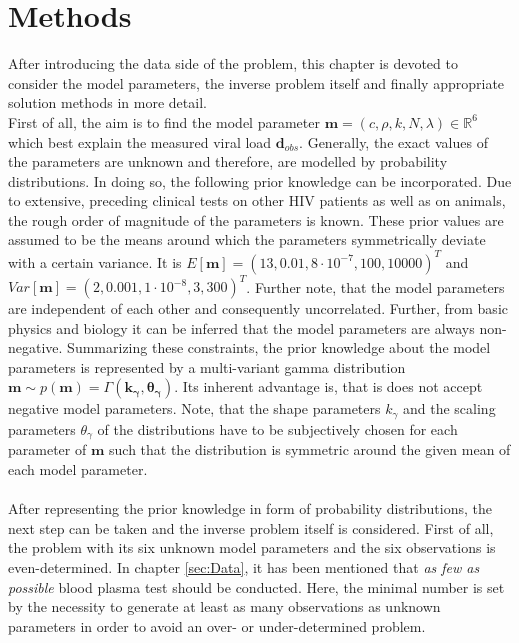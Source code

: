 \section{Methods}
\label{sec:methods}

After introducing the data side of the problem, this chapter is devoted to consider the model parameters, the inverse problem itself and finally appropriate solution methods in more detail.\\
First of all, the aim is to find the model parameter $\mathbf{m} = (c, \rho, k, N, \lambda) \in \mathbb{R}^6$ which best explain the measured viral load $\mathbf{d}_{obs}$.
Generally, the exact values of the parameters are unknown and therefore, are modelled by probability distributions.
In doing so, the following prior knowledge can be incorporated.
Due to extensive, preceding clinical tests on other HIV patients as well as on animals, the rough order of magnitude of the parameters is known.
These prior values are assumed to be the means around which the parameters symmetrically deviate with a certain variance.
It is $E[\mathbf{m}] = (13, 0.01, 8\cdot 10^{-7}, 100, 10 000)^T$ \cite{ADAMS200510} and $Var[\mathbf{m}] = (2, 0.001, 1\cdot 10^{-8}, 3, 300)^T$.
Further note, that the model parameters are independent of each other and consequently uncorrelated.
Further, from basic physics and biology it can be inferred that the model parameters are always non-negative.
Summarizing these constraints, the prior knowledge about the model parameters is represented by a multi-variant gamma distribution $\mathbf{m} \sim p(\mathbf{m}) = \Gamma (\mathbf{k_{\gamma}}, \mathbf{\theta_{\gamma}})$.
Its inherent advantage is, that is does not accept negative model parameters.
Note, that the shape parameters $k_{\gamma}$ and the scaling parameters $\theta_{\gamma}$ of the distributions have to be subjectively chosen for each parameter of $\mathbf{m}$ such that the distribution is symmetric around the given mean of each model parameter.\\ \\
After representing the prior knowledge in form of probability distributions, the next step can be taken and the inverse problem itself is considered.
First of all, the problem with its six unknown model parameters and the six observations is even-determined.
In chapter \ref{sec:Data}, it has been mentioned that \textit{as few as possible} blood plasma test should be conducted.
Here, the minimal number is set by the necessity to generate at least as many observations as unknown parameters in order to avoid an over- or under-determined problem.\\
